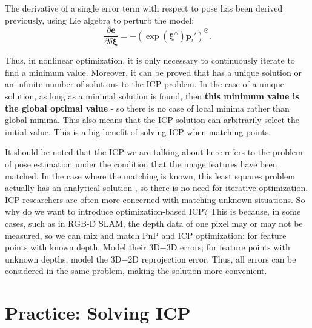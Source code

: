 The derivative of a single error term with respect to pose has been derived previously, using Lie algebra to perturb the model:
\begin{equation}
\frac{{\partial \bm{e}}}{{\partial \delta \boldsymbol{\xi} }} = - {\left( {\exp \left( {{ \boldsymbol{\xi} ^ \wedge }} \right){{\bm{p}}_i}'} \right)^ \odot }.
\end{equation}

Thus, in nonlinear optimization, it is only necessary to continuously iterate to find a minimum value. Moreover, it can be proved that \textsuperscript{\cite{Barfoot2016}} has a unique solution or an infinite number of solutions to the ICP problem. In the case of a unique solution, as long as a minimal solution is found, then \textbf{this minimum value is the global optimal value} - so there is no case of local minima rather than global minima. This also means that the ICP solution can arbitrarily select the initial value. This is a big benefit of solving ICP when matching points.

It should be noted that the ICP we are talking about here refers to the problem of pose estimation under the condition that the image features have been matched. In the case where the matching is known, this least squares problem actually has an analytical solution \textsuperscript{\cite{Faugeras1986, Horn1987, Sharp2002}}, so there is no need for iterative optimization. ICP researchers are often more concerned with matching unknown situations. So why do we want to introduce optimization-based ICP? This is because, in some cases, such as in RGB-D SLAM, the depth data of one pixel may or may not be measured, so we can mix and match PnP and ICP optimization: for feature points with known depth, Model their 3D−3D errors; for feature points with unknown depths, model the 3D−2D reprojection error. Thus, all errors can be considered in the same problem, making the solution more convenient.

\section{Practice: Solving ICP}
